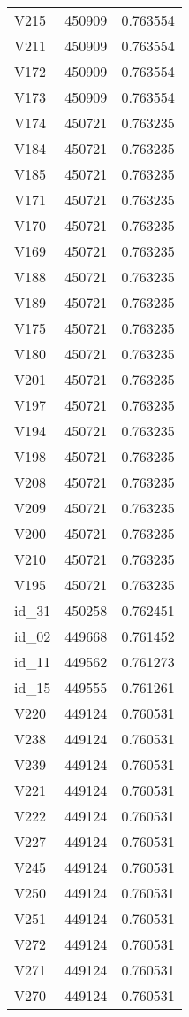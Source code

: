 \begin{tabular}{lrr}
V215 & 450909 & 0.763554 \\
V211 & 450909 & 0.763554 \\
V172 & 450909 & 0.763554 \\
V173 & 450909 & 0.763554 \\
V174 & 450721 & 0.763235 \\
V184 & 450721 & 0.763235 \\
V185 & 450721 & 0.763235 \\
V171 & 450721 & 0.763235 \\
V170 & 450721 & 0.763235 \\
V169 & 450721 & 0.763235 \\
V188 & 450721 & 0.763235 \\
V189 & 450721 & 0.763235 \\
V175 & 450721 & 0.763235 \\
V180 & 450721 & 0.763235 \\
V201 & 450721 & 0.763235 \\
V197 & 450721 & 0.763235 \\
V194 & 450721 & 0.763235 \\
V198 & 450721 & 0.763235 \\
V208 & 450721 & 0.763235 \\
V209 & 450721 & 0.763235 \\
V200 & 450721 & 0.763235 \\
V210 & 450721 & 0.763235 \\
V195 & 450721 & 0.763235 \\
id_31 & 450258 & 0.762451 \\
id_02 & 449668 & 0.761452 \\
id_11 & 449562 & 0.761273 \\
id_15 & 449555 & 0.761261 \\
V220 & 449124 & 0.760531 \\
V238 & 449124 & 0.760531 \\
V239 & 449124 & 0.760531 \\
V221 & 449124 & 0.760531 \\
V222 & 449124 & 0.760531 \\
V227 & 449124 & 0.760531 \\
V245 & 449124 & 0.760531 \\
V250 & 449124 & 0.760531 \\
V251 & 449124 & 0.760531 \\
V272 & 449124 & 0.760531 \\
V271 & 449124 & 0.760531 \\
V270 & 449124 & 0.760531 \\

\end{tabular}
